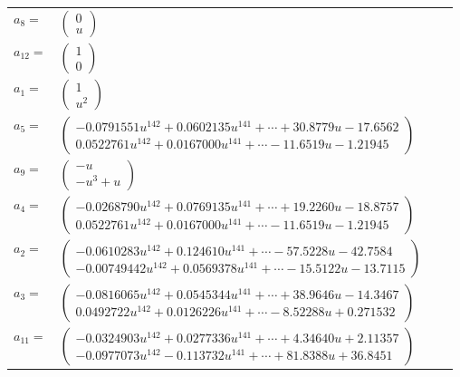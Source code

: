 \documentclass[1p]{elsarticle_modified}
\theoremstyle{definition}
\begin{document}
\begin{tabular}{m{7pt} m{180pt} m{7pt} m{180pt} }
\flushright $a_{8}=$&$\begin{pmatrix}0\\u\end{pmatrix}$ \\
\flushright $a_{12}=$&$\begin{pmatrix}1\\0\end{pmatrix}$ \\
\flushright $a_{1}=$&$\begin{pmatrix}1\\u^2\end{pmatrix}$ \\
\flushright $a_{5}=$&$\begin{pmatrix}-0.0791551 u^{142}+0.0602135 u^{141}+\cdots+30.8779 u-17.6562\\0.0522761 u^{142}+0.0167000 u^{141}+\cdots-11.6519 u-1.21945\end{pmatrix}$ \\
\flushright $a_{9}=$&$\begin{pmatrix}- u\\- u^3+u\end{pmatrix}$ \\
\flushright $a_{4}=$&$\begin{pmatrix}-0.0268790 u^{142}+0.0769135 u^{141}+\cdots+19.2260 u-18.8757\\0.0522761 u^{142}+0.0167000 u^{141}+\cdots-11.6519 u-1.21945\end{pmatrix}$ \\
\flushright $a_{2}=$&$\begin{pmatrix}-0.0610283 u^{142}+0.124610 u^{141}+\cdots-57.5228 u-42.7584\\-0.00749442 u^{142}+0.0569378 u^{141}+\cdots-15.5122 u-13.7115\end{pmatrix}$ \\
\flushright $a_{3}=$&$\begin{pmatrix}-0.0816065 u^{142}+0.0545344 u^{141}+\cdots+38.9646 u-14.3467\\0.0492722 u^{142}+0.0126226 u^{141}+\cdots-8.52288 u+0.271532\end{pmatrix}$ \\
\flushright $a_{11}=$&$\begin{pmatrix}-0.0324903 u^{142}+0.0277336 u^{141}+\cdots+4.34640 u+2.11357\\-0.0977073 u^{142}-0.113732 u^{141}+\cdots+81.8388 u+36.8451\end{pmatrix}$ \\

\end{tabular}
\end{document}

